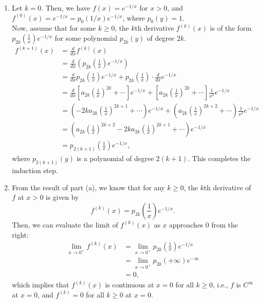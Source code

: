 \documentclass[en, oneside]{vivi}
\begin{document}
\begin{sol}
    \begin{enumerate}[label=(\alph*)]
        \item Let $k = 0$. Then, we have $f(x) = e^{-1/x}$ for $x > 0$, and $f^{(0)}(x) = e^{-1/x} = p_0(1/x) e^{-1/x}$, where $p_0(y) = 1$.\\
        Now, assume that for some $k \geq 0$, the $k$th derivative $f^{(k)}(x)$ is of the form $p_{2k}(\frac{1}{x}) e^{-1/x}$ for some polynomial $p_{2k}(y)$ of degree $2k$.
        \begin{align*}
            f^{(k+1)}(x) &= \frac{d}{dx} f^{(k)}(x)\\
            &= \frac{d}{dx} \left( p_{2k}(\frac{1}{x}) e^{-1/x} \right)\\
            &= \frac{d}{dx} p_{2k}(\frac{1}{x}) e^{-1/x} + p_{2k}(\frac{1}{x}) \cdot \frac{d}{dx} e^{-1/x}\\
            &= \frac{d}{dx} \left[ a_{2k} \left( \frac{1}{x} \right)^{2k} + \cdots \right] e^{-1/x} + \left[ a_{2k} \left( \frac{1}{x} \right)^{2k} + \cdots \right] \frac{1}{x^2} e^{-1/x}\\
            &= \left( -2k a_{2k} \left( \frac{1}{x} \right)^{2k+1} + \cdots \right) e^{-1/x} + \left( a_{2k} \left( \frac{1}{x} \right)^{2k+2} + \cdots \right) \frac{1}{x^2} e^{-1/x}\\
            &= \left( a_{2k} \left( \frac{1}{x} \right)^{2k+2} -2k a_{2k} \left( \frac{1}{x} \right)^{2k+1} + \cdots \right) e^{-1/x}\\
            &= p_{2(k+1)}(\frac{1}{x}) e^{-1/x},
        \end{align*}
        where $p_{2(k+1)}(y)$ is a polynomial of degree $2(k+1)$. This completes the induction step.
        \item From the result of part (a), we know that for any $k \geq 0$, the $k$th derivative of $f$ at $x > 0$ is given by
        \begin{equation*}
            f^{(k)}(x) = p_{2k}(\frac{1}{x}) e^{-1/x}.
        \end{equation*}
        Then, we can evaluate the limit of $f^{(k)}(x)$ as $x$ approaches 0 from the right:
        \begin{align*}
            \lim_{x \to 0^+} f^{(k)}(x) &= \lim_{x \to 0^+} p_{2k}(\frac{1}{x}) e^{-1/x}\\
            &= \lim_{x \to 0^+} p_{2k}(+\infty) e^{-\infty}\\
            &= 0,
        \end{align*}
        which implies that $f^{(k)}(x)$ is continuous at $x = 0$ for all $k \geq 0$, i.e., $f$ is $C^\infty$ at $x = 0$, and $f^{(k)} = 0$ for all $k \geq 0$ at $x = 0$.
    \end{enumerate}
\end{sol}
\end{document}
